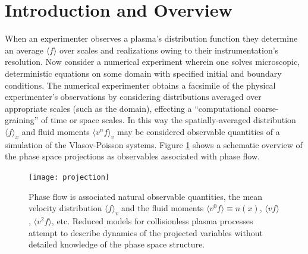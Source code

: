 \documentclass{article}
\begin{document}
\section{Introduction and Overview}
When an experimenter observes a plasma's distribution function they determine an average $\langle f\rangle$ over scales and realizations owing to their instrumentation's resolution. Now consider a numerical experiment wherein one solves microscopic, deterministic equations on some domain with specified initial and boundary conditions. The numerical experimenter obtains a facsimile of the physical experimenter's observations by considering distributions averaged over appropriate scales (such as the domain), effecting a ``computational coarse-graining'' of time or space scales. In this way the spatially-averaged distribution $\langle f\rangle_x$ and fluid moments $\langle v^nf\rangle_v$ may be considered observable quantities of a simulation of the Vlasov-Poisson systems. Figure \ref{projection} shows a schematic overview of the phase space projections as observables associated with phase flow.

\begin{figure}[hb!]
  \centering
  \texttt{[image: projection]}
  \caption{Phase flow is associated natural observable quantities, the mean velocity distribution $\langle f\rangle_v$ and the fluid moments $\langle v^0f\rangle\equiv n(x)$, $\langle vf\rangle$, $\langle v^2f\rangle$, etc. Reduced models for collisionless plasma processes attempt to describe dynamics of the projected variables without detailed knowledge of the phase space structure.}\label{projection}
\end{figure}

\end{document}
